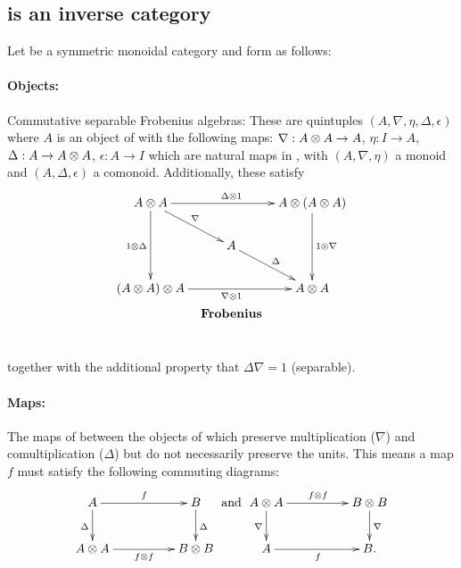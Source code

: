 \subsection{\CFrob is an inverse category}\label{ssec:cfrob_x_is_an_inverse_category}
\begin{example}\label{example:commfrob}
  Let \X be a symmetric monoidal category and form \CFrob as follows: \paragraph{\textbf{Objects:}}
  Commutative separable Frobenius algebras: These are quintuples
  $(A,\nabla,\eta,\Delta,\epsilon)$ where $A$ is an object of \X with the following maps:
  $\nabla :A\otimes A \to A$, $\eta:I\to A$, $\Delta : A \to A\otimes A$, $\epsilon : A \to I$ which are natural
  maps in \X, with $(A,\nabla,\eta)$ a monoid and $(A,\Delta,\epsilon)$ a comonoid. Additionally,
  these satisfy
  \[
    \xymatrix @C=10pt @R=20pt{
      A \* A \ar[dd]_{1\*\Delta} \ar[dr]^{\nabla}
        \ar[rr]^{\Delta \* 1} & &
        A \* (A \* A) \ar[dd]^{1 \* \nabla}\\
      & A \ar[dr]^{\Delta} & \\
      (A \* A) \* A \ar[rr]_{\nabla \* 1} & &
        A \* A\\
      &*!<0pt,-25pt>{\text{\textbf{Frobenius}}}
    }
  \]
  together with the additional property that $\Delta \nabla = 1$ (separable).

  \paragraph{\textbf{Maps:}} The maps of \X between the objects of \X which preserve multiplication ($\nabla$)
  and comultiplication ($\Delta$) but do not necessarily preserve the units.
  This means a map $f$ must satisfy the following commuting diagrams:
  \[
    \xymatrix@C+25pt{
      A \ar[d]_{\Delta} \ar[r]^{f} & B \ar[d]^{\Delta}\\
      A\*A \ar[r]_{f\*f} & B\* B
    }
    \text{ and }
    \xymatrix@C+25pt{
      A\*A \ar[d]_{\nabla} \ar[r]^{f\*f}& B\*B \ar[d]^{\nabla}\\
      A \ar[r]_{f} & B.
    }
  \]
\end{example}

